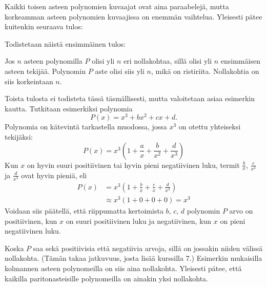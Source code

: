 
Kaikki toisen asteen polynomien kuvaajat ovat aina paraabelejä, mutta korkeamman asteen polynomien kuvaajissa on enemmän vaihtelua. Yleisesti pätee kuitenkin seuraava tulos:


Todistetaan näistä ensimmäinen tulos:

\begin{todistus}
Jos $n$ asteen polynomilla $P$ olisi yli $n$ eri nollakohtaa, sillä olisi yli $n$ ensimmäisen asteen tekijää. Polynomin $P$ aste olisi siis yli $n$, mikä on ristiriita. Nollakohtia on siis korkeintaan $n$.
\end{todistus}

Toista tulosta ei todisteta tässä täsmällisesti, mutta valoitetaan asiaa esimerkin kautta. Tutkitaan esimerkiksi polynomia 
$$P(x)=x^3+bx^2+cx+d.$$
Polynomia on kätevintä tarkastella muodossa, jossa $x^3$ on otettu yhteiseksi tekijäksi:
$$P(x) = x^3\left(1+\frac{a}{x}+\frac{b}{x^2}+\frac{d}{x^3}\right)$$
Kun $x$ on hyvin suuri positiivinen tai hyvin pieni negatiivinen luku,
termit $\frac{b}{x}$, $\frac{c}{x^2}$ ja $\frac{d}{x^3}$ ovat hyvin pieniä, eli
\begin{align*}
P(x)&= x^3\left(1+\frac{b}{x}+\frac{c}{x}+\frac{d}{x^3}\right) \\
	& \approx  x^3\left(1+0+0+0\right) = x^3
\end{align*}
Voidaan siis päätellä, että riippumatta kertoimista $b$, $c$, $d$ polynomin $P$ arvo on positiivinen, kun $x$ on suuri positiivinen luku ja negatiivinen, kun $x$ on pieni negatiivinen luku.

Koska $P$ saa sekä positiivisia että negatiivia arvoja, sillä on jossakin niiden välissä nollakohta. (Tämän takaa jatkuvuus, josta lisää kurssilla 7.) Esimerkin mukaisilla kolmannen asteen polynomeilla on siis aina nollakohta. Yleisesti pätee, että kaikilla paritonasteisille polynomeilla on ainakin yksi nollakohta.

